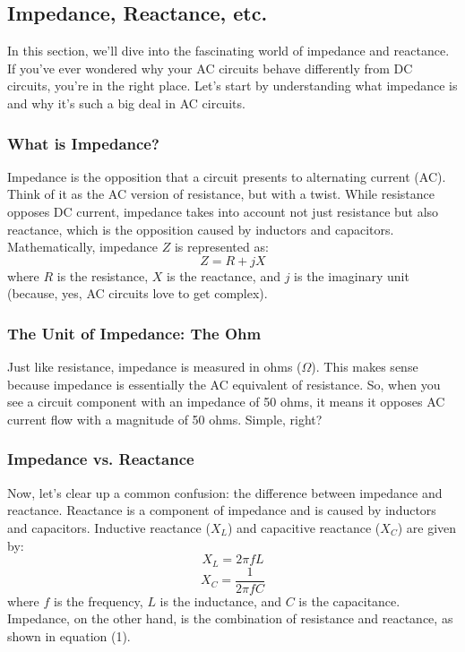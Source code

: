 \subsection{Impedance, Reactance, etc.}
\label{subsec:imp-react}

In this section, we’ll dive into the fascinating world of impedance and reactance. If you’ve ever wondered why your AC circuits behave differently from DC circuits, you’re in the right place. Let’s start by understanding what impedance is and why it’s such a big deal in AC circuits.

\subsubsection*{What is Impedance?}
Impedance is the opposition that a circuit presents to alternating current (AC). Think of it as the AC version of resistance, but with a twist. While resistance opposes DC current, impedance takes into account not just resistance but also reactance, which is the opposition caused by inductors and capacitors. Mathematically, impedance \( Z \) is represented as:
\begin{equation}
    Z = R + jX
\end{equation}
where \( R \) is the resistance, \( X \) is the reactance, and \( j \) is the imaginary unit (because, yes, AC circuits love to get complex).

\subsubsection*{The Unit of Impedance: The Ohm}
Just like resistance, impedance is measured in ohms (\( \Omega \)). This makes sense because impedance is essentially the AC equivalent of resistance. So, when you see a circuit component with an impedance of 50 ohms, it means it opposes AC current flow with a magnitude of 50 ohms. Simple, right?

\subsubsection*{Impedance vs. Reactance}
Now, let’s clear up a common confusion: the difference between impedance and reactance. Reactance is a component of impedance and is caused by inductors and capacitors. Inductive reactance (\( X_L \)) and capacitive reactance (\( X_C \)) are given by:
\begin{equation}
    X_L = 2\pi f L
\end{equation}
\begin{equation}
    X_C = \frac{1}{2\pi f C}
\end{equation}
where \( f \) is the frequency, \( L \) is the inductance, and \( C \) is the capacitance. Impedance, on the other hand, is the combination of resistance and reactance, as shown in equation (1).

